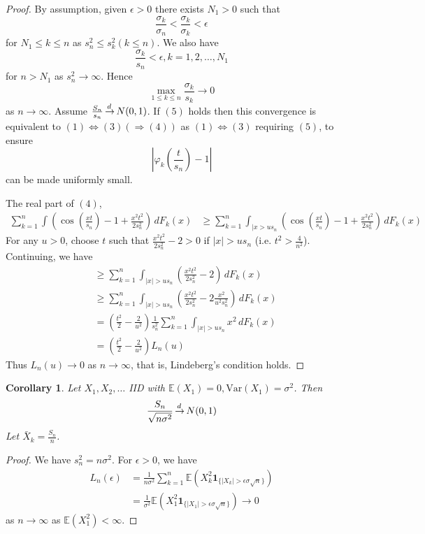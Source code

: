 \documentclass[10pt, oneside, reqno]{amsart}
\theoremstyle{plain}%
\newtheorem{cor}[thm]{Corollary}
\theoremstyle{definition}
\theoremstyle{remark}
\newcommand{\var}{\text{Var}}
\renewcommand{\phi}{\varphi}
\newcommand{\E}{\mathbb{E}}
\def\cid{\,{\buildrel \!d \over \rightarrow}\,}
\newcommand{\indic}[1]{\mathbf{1}_{\{ #1 \}} }
\begin{document}
\begin{proof}
    By assumption, given $\epsilon > 0$ there exists $N_1 > 0$ such that \[
        \frac{\sigma_k}{\sigma_n} < \frac{\sigma_k}{\sigma_k} < \epsilon
    \] for $N_1 \leq k \leq n$ as $s_n^2 \leq s_k^2 (k \leq n)$.  We also have \[
        \frac{\sigma_k}{s_n} < \epsilon, k = 1, 2, \dots, N_1
    \] for $n > N_1$ as $s_n^2 \rightarrow \infty$.  Hence \[
        \max_{1 \leq k \leq n} \frac{\sigma_k}{s_k} \rightarrow 0
    \] as $n \rightarrow \infty$.  Assume $\frac{S_n}{s_n} \cid N(0, 1)$.  If $(5)$ holds then this convergence is equivalent to $(1) \iff (3) ( \Rightarrow (4))$ as $(1) \iff (3)$ requiring $(5)$, to ensure \[
        \left|\phi_{k}(\frac{t}{s_n}) - 1 \right|
    \]  can be made uniformly small.  
    
    The real part of $(4)$, \begin{align*}
        \sum_{k=1}^n \int \left( \cos(\frac{xt}{s_n}) - 1 + \frac{x^2 t^2}{2s_n^2} \right) \, dF_k(x)
        &\geq \sum_{k=1}^n \int_{|x > u s_n} \left( \cos(\frac{xt}{s_n}) - 1 + \frac{x^2 t^2}{2s_n^2} \right) \, dF_k(x)
    \end{align*}  For any $u > 0$, choose $t$ such that $\frac{x^2 t^2}{2 s_n^2} - 2 > 0$ if $|x| > u s_n$ (i.e. $t^2 > \frac{4}{n^2}$).  Continuing, we have \begin{align*}
        &\geq \sum_{k=1}^n \int_{|x| > u s_n} \left( \frac{x^2 t^2}{2 s_n^2} - 2 \right) \, dF_k(x) \\
        &\geq \sum_{k=1}^n \int_{|x| > u s_n} \left(\frac{x^2 t^2}{2s_n^2} - 2\frac{x^2}{u^2 s_n^2} \right) \, dF_k(x) \\
        &= \left(\frac{t^2}{2} - \frac{2}{u^2}\right) \frac{1}{s_n^2} \sum_{k=1}^n \int_{|x| > u s_n} x^2 \, dF_k(x) \\
        &= \left(\frac{t^2}{2} - \frac{2}{u^2}\right) L_n(u)
    \end{align*} Thus $L_n(u) \rightarrow 0$ as $n \rightarrow \infty$, that is, Lindeberg's condition holds.
\end{proof}

\begin{cor}
    Let $X_1, X_2, \dots$ IID with $\E(X_1) = 0, \var(X_1) = \sigma^2$.  Then \[
        \frac{S_n}{\sqrt{n \sigma^2}} \cid N(0, 1)
    \] Let $\bar X_k = \frac{S_n}{n}$.
\end{cor}

\begin{proof}
     We have $s_n^2 = n \sigma^2$.  For $\epsilon > 0$, we have \begin{align*}
        L_n(\epsilon) &= \frac{1}{n \sigma^2} \sum_{k=1}^n \E( X_k^2 \indic{|X_k| > \epsilon \sigma \sqrt{n}}) \\
        &= \frac{1}{\sigma^2} \E(X_1^2 \indic{|X_1| > \epsilon \sigma \sqrt{n}}) \rightarrow 0
    \end{align*} as $n \rightarrow \infty$ as $\E(X_1^2) < \infty$.
\end{proof}
\end{document}
